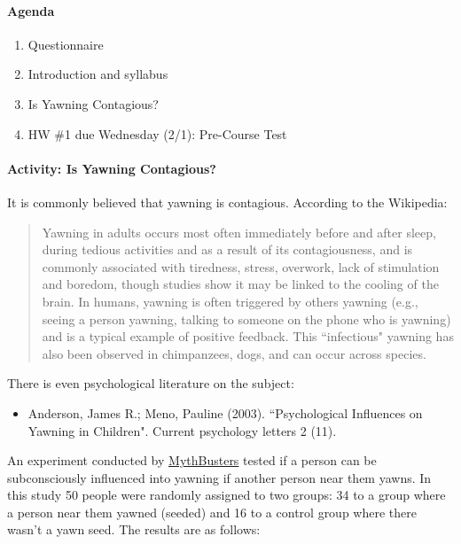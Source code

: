 \documentclass[10pt]{article}
\begin{document}


\paragraph{Agenda}
\begin{enumerate}
  \itemsep0em
  \item Questionnaire
  \item Introduction and syllabus
  \item Is Yawning Contagious?
  \item HW \#1 due Wednesday (2/1): Pre-Course Test
\end{enumerate}

\paragraph{Activity: Is Yawning Contagious?}

It is commonly believed that yawning is contagious. According to the Wikipedia:
\begin{quotation}
Yawning in adults occurs most often immediately before and after sleep, during tedious activities and as a result of its contagiousness, and is commonly associated with tiredness, stress, overwork, lack of stimulation and boredom, though studies show it may be linked to the cooling of the brain. In humans, yawning is often triggered by others yawning (e.g., seeing a person yawning, talking to someone on the phone who is yawning) and is a typical example of positive feedback. This ``infectious" yawning has also been observed in chimpanzees, dogs, and can occur across species.
\end{quotation}
There is even psychological literature on the subject:
\begin{itemize}
  \item Anderson, James R.; Meno, Pauline (2003). ``Psychological Influences on Yawning in Children". Current psychology letters 2 (11).
\end{itemize}

An experiment conducted by \href{http://www.discovery.com/tv-shows/mythbusters/videos/is-yawning-contagious-minimyth/}{MythBusters} tested if a person can be subconsciously influenced into yawning if another person near them yawns. 
In this study 50 people were randomly assigned to two groups: 34 to a group where a person near them yawned (seeded) and 16 to a control group where there wasn't a yawn seed. The results are as follows:
\end{document}
